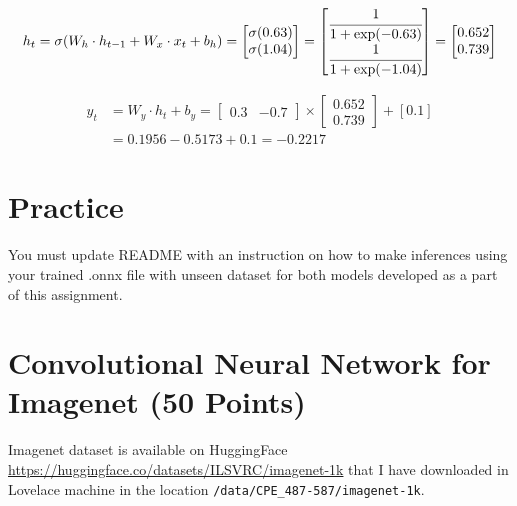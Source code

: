 \documentclass[12pt, xcolor=dvipsnames,svgnames,x11names]{article}
\begin{document}
\begin{equation}
    \begin{aligned}
        h_t = \sigma(W_h \cdot h_{t-1} + W_x \cdot x_t + b_h)  = \begin{bmatrix}
            \sigma(0.63) \\ \sigma(1.04)
        \end{bmatrix} = \begin{bmatrix}
            \cfrac{1}{1 + \exp(-0.63)} \\ \cfrac{1}{1 + \exp(-1.04)}
        \end{bmatrix} = \begin{bmatrix}
            0.652 \\ 0.739
        \end{bmatrix}
    \end{aligned}
\end{equation}


\begin{equation}
    \begin{aligned}
        y_t & = W_y \cdot h_t + b_y  =  \begin{bmatrix} 0.3 & -0.7 \end{bmatrix} \times \begin{bmatrix}
            0.652 \\ 0.739
        \end{bmatrix} + [0.1]\\
        & = 0.1956 - 0.5173 + 0.1 = -0.2217
    \end{aligned}
\end{equation}


\section*{Practice}

You must update README with an instruction on how to make inferences using your trained .onnx file with unseen dataset for both models developed as a part of this assignment.


\section{Convolutional Neural Network for Imagenet \hfill \textbf{(50 Points)}}

Imagenet dataset is available on HuggingFace \url{https://huggingface.co/datasets/ILSVRC/imagenet-1k} that I have downloaded in Lovelace machine in the location \texttt{/data/CPE_487-587/imagenet-1k}.
\end{document}
